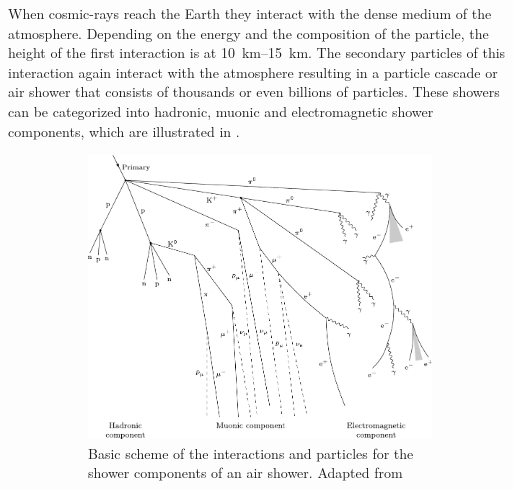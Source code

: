 When cosmic-rays reach the Earth they interact with the dense medium of the atmosphere.
Depending on the energy and the composition of the particle, the height of the first interaction is at \SIrange{10}{15}{km}.
The secondary particles of this interaction again interact with the atmosphere resulting in a particle cascade or air shower that consists of thousands or even billions of particles.
These showers can be categorized into hadronic, muonic and electromagnetic shower components, which are illustrated in .

\begin{figure}
    \centering
    \begin{subfigure}[t]{0.58\textwidth}
        \centering
        \includegraphics[width=\textwidth]{./images/air_shower_components.pdf}
        \caption{Basic scheme of the interactions and particles for the shower components of an air shower. Adapted from \cite{Krause15ICRC}}
        \label{fig:air_shower_components}
    \end{subfigure}
    \hfill
    \begin{subfigure}[t]{0.38\textwidth}
        \centering

\end{subfigure}
\end{figure}
